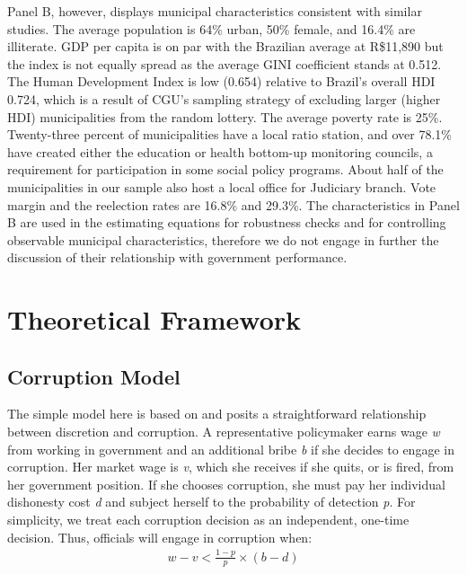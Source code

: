 \documentclass[11pt]{article}
\begin{document}
Panel B, however, displays municipal characteristics consistent with similar studies. The average population is 64\% urban, 50\% female, and 16.4\% are illiterate. GDP per capita is on par with the Brazilian average at R\$11,890 but the index is not equally spread as the average GINI coefficient stands at 0.512. The Human Development Index is low (0.654) relative to Brazil's overall HDI 0.724, which is a result of CGU's sampling strategy of excluding larger (higher HDI) municipalities from the random lottery. The average poverty rate is 25\%. Twenty-three percent of municipalities have a local ratio station, and over 78.1\% have created either the education or health bottom-up monitoring councils, a requirement for participation in some social policy programs. About half of the municipalities in our sample also host a local office for Judiciary branch. Vote margin and the reelection rates are 16.8\% and 29.3\%. The characteristics in Panel B are used in the estimating equations for robustness checks and for controlling observable municipal characteristics, therefore we do not engage in further the discussion of their relationship with government performance.

\section{Theoretical Framework} \label{sec:theory}

\subsection{Corruption Model} \label{subsec:corruption}

The simple model here is based on \citet{OlkenCorruptionDevelopingCountries2012b} and posits a straightforward relationship between discretion and corruption. A representative policymaker earns wage \emph{w} from working in government and an additional bribe \emph{b} if she decides to engage in corruption. Her market wage is \emph{v}, which she receives if she quits, or is fired, from her government position. If she chooses corruption, she must pay her individual dishonesty cost \emph{d} and subject herself to the probability of detection \emph{p}. For simplicity, we treat each corruption decision as an independent, one-time decision. Thus, officials will engage in corruption when:
\begin{equation} \label{eq:simplemodel}
  \begin{split}
    w - v < \frac{1-p}{p}\times(b-d)
  \end{split}
\end{equation}
\end{document}
